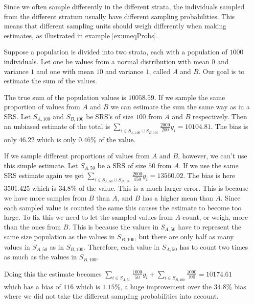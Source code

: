 \documentclass{article}
\begin{document}
Since we often sample differently in the different strata,
the individuals sampled from the different stratum usually have
different sampling probabilities. This means that different sampling units
should weigh differently when making estimates, as illustrated in example \ref{ex:uneqProbs}.

\begin{example} \label{ex:uneqProbs}
  Suppose a population is divided into two strata, each with a population of
  \(1000\) individuals. Let one be values from a normal distribution with mean
  \(0\) and variance \(1\) and one with mean \(10\) and variance \(1\), called
  \(A\) and \(B\).
  Our goal is to estimate the sum of the values.

  The true sum of the population values is \(10058.59\). If we sample the same
  proportion of values from \(A\) and \(B\) we can estimate the sum the same way
  as in a SRS. Let \(S_{A, 100}\) and
  \(S_{B, 100}\) be SRS's of size \(100\) from \(A\) and \(B\) respectively.
  Then an unbiased estimate of the total is \(\sum_{i \in S_{A, 100} \cup S_{B,
      100} } \frac{2000}{200} y_i = 10104.81\). The bias is only \(46.22\) which is only \(0.46\%\) of the
  value.

  If we sample different proportions of values from \(A\) and \(B\), however, we
  can't use this simple estimate. Let \(S_{A, 50}\) be a SRS of size \(50\)
  from \(A\). If we use the same SRS estimate again we get \(\sum_{i \in S_{A, 50} \cup S_{B,
      100}} \frac{2000}{150} y_i = 13560.02\). The bias is here \(3501.425\) which is \(34.8\%\) of the
  value. This is a much larger error. This is because we have more samples from
  \(B\) than \(A\), and \(B\) has a higher mean than \(A\). Since each sampled
  value is counted the same this causes the estimate to become too large. To fix
  this we need to let the sampled values from \(A\) count, or weigh, more than
  the ones from \(B\). This is because the values in \(S_{A, 50}\) have to
  represent the same size population as the values in \(S_{B, 100}\), but there
  are only half as many values in \(S_{A, 50}\) as in \(S_{B, 100}\). Therefore,
  each value in \(S_{A, 50}\) has to count two times as much as the values in \(S_{B, 100}\).

  Doing this the estimate becomes \(\sum_{i
    \in S_{A, 50}} \frac{1000}{50} y_i + \sum_{i \in S_{B, 100}}
  \frac{1000}{100} = 10174.61\) which has a bias of \(116\) which is \(1.15\%\),
  a huge improvement over the \(34.8\%\) bias where we did not take the
  different sampling probabilities into account.
\end{example}
\end{document}
